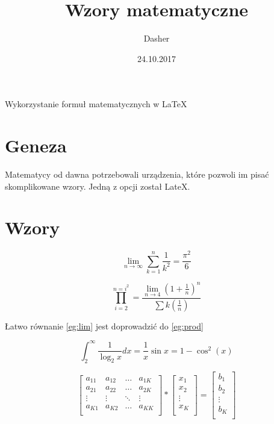 \documentclass[a4paper,12pt]{article}
\title{Wzory matematyczne}
\author{Dasher}
\date{24.10.2017}
\begin{document}
\maketitle

Wykorzystanie formuł matematycznych w LaTeX

\tableofcontents

\section{Geneza}
Matematycy od dawna potrzebowali urządzenia, które pozwoli im pisać skomplikowane wzory. Jedną z opcji został LateX.

\section{Wzory}

\begin{equation}
\label{eg:lim}
\lim_{n \to \infty}
	\sum_{k=1}^n \frac{1}{k^2}
		= \frac{\pi^2}{6}
\end{equation}

\begin{equation}
\label{eg:prod}
\prod_{i=2}^{n=i^2}
	= \frac{\lim\limits_{n \to 4}{(1+\frac{1}{n})^n}}{\sum k(\frac{1}{n})}
\end{equation}

Łatwo równanie \ref{eg:lim} jest doprowadzić do \ref{eg:prod}

\begin{equation}
\label{eg:int}
\int_{2}^{\infty} \frac{1}{\log_{2}x}dx= 
	\frac{1}{x}\sin{x}=1-\cos^2{(x)}
\end{equation}

\begin{equation}
\label{eg:array}
\left[ \begin{array}{cccc}
a_{11} & a_{12} & \ldots & a_{1K} \\
a_{21} & a_{22} & \ldots & a_{2K} \\
\vdots & \vdots & \ddots & \vdots \\
a_{K1} & a_{K2} & \ldots & a_{KK} \\
\end{array} \right]*
\left[ \begin{array}{c}
x_{1} \\
x_{2} \\
\vdots \\
x_{K} \\
\end{array} \right]=
\left[ \begin{array}{c}
b_{1} \\
b_{2} \\
\vdots \\
b_{K} \\
\end{array} \right]
\end{equation}
\end{document}
